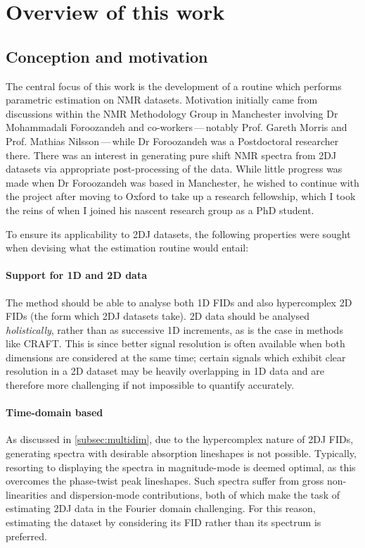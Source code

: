 \section{Overview of this work}

\subsection{Conception and motivation}
The central focus of this work is the development of a routine which performs
parametric estimation on \ac{NMR} datasets.
Motivation initially came from discussions within the NMR
Methodology Group in Manchester involving
Dr Mohammadali Foroozandeh and co-workers\,---\,notably Prof.
Gareth Morris and Prof. Mathias Nilsson\,---\,while Dr Foroozandeh was a
Postdoctoral researcher there. There was an interest in generating pure shift
\ac{NMR} spectra from \ac{2DJ} datasets via appropriate post-processing of the
data.  While little progress was made when Dr Foroozandeh was based in
Manchester, he wished to continue with the project after moving to Oxford to
take up a research fellowship, which I took the reins of when I joined his
nascent research group as a PhD student.

To ensure its applicability to \ac{2DJ} datasets, the following properties were
sought when devising what the estimation routine would entail:

\paragraph{Support for \ac{1D} and \ac{2D} data}
The method should be able to analyse both \ac{1D} \acp{FID} and also
hypercomplex \ac{2D} \acp{FID} (the form which \ac{2DJ} datasets take).
\ac{2D} data should be analysed \emph{holistically},
rather than as successive \ac{1D} increments, as is the case in methods like
\ac{CRAFT}\cite{Krishnamurthy2017}. This is since
better signal resolution is often available when both dimensions are
considered at the same time; certain signals which exhibit clear resolution in a
\ac{2D} dataset may be heavily overlapping in \ac{1D} data and are
therefore more challenging if not impossible to quantify accurately.

\paragraph{Time-domain based}
As discussed in \cref{subsec:multidim}, due to the hypercomplex nature of
\ac{2DJ} \acp{FID}, generating spectra with desirable absorption lineshapes is
not possible. Typically, resorting to displaying the spectra in magnitude-mode is
deemed optimal, as this overcomes the phase-twist peak lineshapes. Such
spectra suffer from gross non-linearities and dispersion-mode contributions,
both of which make the task of estimating \ac{2DJ} data in the Fourier domain
challenging. For this reason, estimating the dataset by considering its \ac{FID}
rather than its spectrum is preferred.

